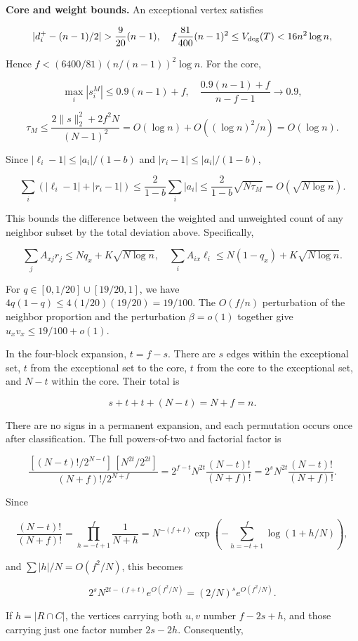 \documentclass[11pt,a4paper]{article}
\begin{document}
\textbf{Core and weight bounds.} An exceptional vertex satisfies

\[
|d_i^+-(n-1)/2|>\frac9{20}(n-1),\quad
f\frac{81}{400}(n-1)^2\le V_{\rm deg}(T)<16n^2\log n,
\]

Hence \(f<(6400/81)(n/(n-1))^2\log n\). For the core,

\[
\max_i|s_i^M|\le0.9(n-1)+f,
\quad \frac{0.9(n-1)+f}{n-f-1}\longrightarrow0.9,
\]

\[
\tau_M\le\frac{2\|s\|_2^2+2f^2N}{(N-1)^2}
=O(\log n)+O((\log n)^2/n)=O(\log n).
\]

Since \(|\ell_i-1|\le|a_i|/(1-b)\) and \(|r_i-1|\le|a_i|/(1-b)\),

\[
\sum_i(|\ell_i-1|+|r_i-1|)
\le\frac2{1-b}\sum_i|a_i|
\le\frac2{1-b}\sqrt{N\tau_M}=O(\sqrt{N\log n}).
\]

This bounds the difference between the weighted and unweighted count of any neighbor subset by the total deviation above. Specifically,

\[
\sum_jA_{xj}r_j\le Nq_x+K\sqrt{N\log n},\quad
\sum_iA_{ix}\ell_i\le N(1-q_x)+K\sqrt{N\log n}.
\]

For \(q\in[0,1/20]\cup[19/20,1]\), we have \(4q(1-q)\le4(1/20)(19/20)=19/100\). The \(O(f/n)\) perturbation of the neighbor proportion and the perturbation \(\beta=o(1)\) together give \(u_xv_x\le19/100+o(1)\).

In the four-block expansion, \(t=f-s\). There are \(s\) edges within the exceptional set, \(t\) from the exceptional set to the core, \(t\) from the core to the exceptional set, and \(N-t\) within the core. Their total is

\[
s+t+t+(N-t)=N+f=n.
\]

There are no signs in a permanent expansion, and each permutation occurs once after classification. The full powers-of-two and factorial factor is

\[
\frac{[(N-t)!/2^{N-t}]\,[N^{2t}/2^{2t}]}{(N+f)!/2^{N+f}}
=2^{f-t}N^{2t}\frac{(N-t)!}{(N+f)!}
=2^sN^{2t}\frac{(N-t)!}{(N+f)!}.
\]

Since

\[
\frac{(N-t)!}{(N+f)!}=\prod_{h=-t+1}^{f}\frac1{N+h}
=N^{-(f+t)}\exp\left(-\sum_{h=-t+1}^{f}\log(1+h/N)\right),
\]

and \(\sum|h|/N=O(f^2/N)\), this becomes

\[
2^sN^{2t-(f+t)}e^{O(f^2/N)}=(2/N)^se^{O(f^2/N)}.
\]

If \(h=|R\cap C|\), the vertices carrying both \(u,v\) number \(f-2s+h\), and those carrying just one factor number \(2s-2h\). Consequently,
\end{document}
